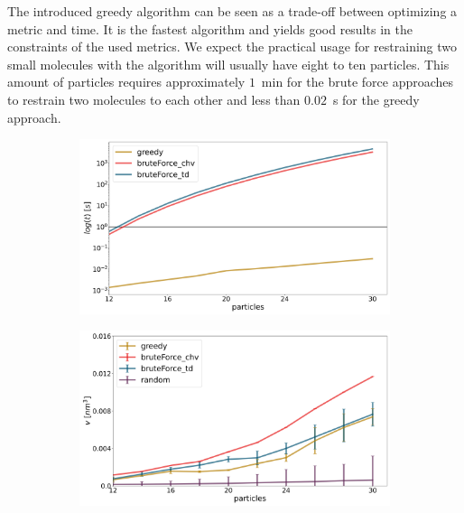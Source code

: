 The introduced greedy algorithm can be seen as a trade-off between optimizing a metric and time. It is the fastest algorithm and yields good results in the constraints of the used metrics. We expect the practical usage for restraining two small molecules with the algorithm will usually have eight to ten particles. This amount of particles requires approximately $1$~min for the brute force approaches to restrain two molecules to each other and less than $0.02$~s for the greedy approach. 
\begin{figure}[H]
    \centering
    \begin{subfigure}{0.45\columnwidth}
        \includegraphics[width=\textwidth]{fig/results/algorithm/algorithms_timings.png}
        \caption{}
        \label{fig: time_algorithms}
    \end{subfigure}
    \begin{subfigure}{0.45\columnwidth}
        \includegraphics[width=\textwidth]{fig/results/algorithm/restraint_volumes_algorithms.png}
        \caption{}
        \label{fig: ch_algorithms}
    \end{subfigure}

\end{figure}
